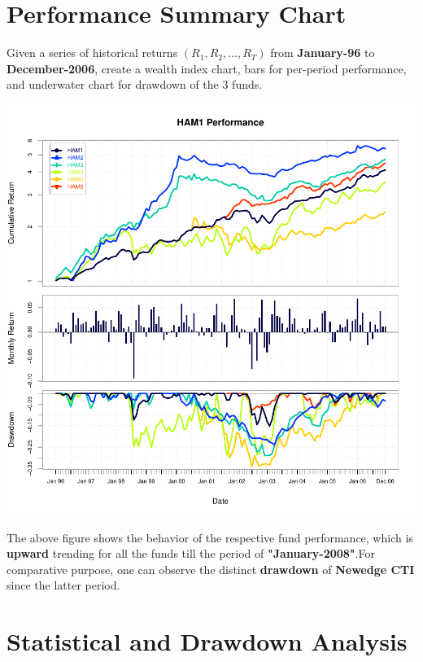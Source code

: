 \documentclass[12pt,letterpaper,english]{article}
\begin{document}

\section{Performance Summary Chart}

Given a series  of historical returns \((R_1,R_2, . . .,R_T)\) from \textbf{January-96} to \textbf{December-2006}, create a wealth index chart, bars for per-period performance, and underwater chart for drawdown of the 3 funds.

\includegraphics{Managers-002}

The above figure shows the behavior of the respective fund performance, which is \textbf{upward} trending for all the funds till the period of \textbf{"January-2008"}.For comparative purpose, one can observe the distinct \textbf{drawdown} of \textbf{Newedge CTI} since the latter period.

\section{Statistical and Drawdown Analysis}
\end{document}
